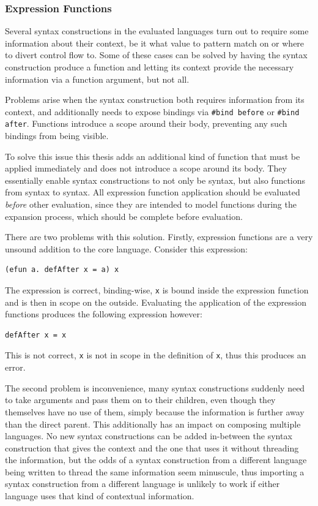 \documentclass{kththesis}
\begin{document}
\subsubsection{Expression Functions} \label{sec:efun-drawbacks}

Several syntax constructions in the evaluated languages turn out to require some information about their context, be it what value to pattern match on or where to divert control flow to. Some of these cases can be solved by having the syntax construction produce a function and letting its context provide the necessary information via a function argument, but not all.

Problems arise when the syntax construction both requires information from its context, and additionally needs to expose bindings via \texttt{#bind before} or \texttt{#bind after}. Functions introduce a scope around their body, preventing any such bindings from being visible.

To solve this issue this thesis adds an additional kind of function that must be applied immediately and does not introduce a scope around its body. They essentially enable syntax constructions to not only be syntax, but also functions from syntax to syntax. All expression function application should be evaluated \emph{before} other evaluation, since they are intended to model functions during the expansion process, which should be complete before evaluation.

There are two problems with this solution. Firstly, expression functions are a very unsound addition to the core language. Consider this expression:

\begin{verbatim}
(efun a. defAfter x = a) x
\end{verbatim}

The expression is correct, binding-wise, \texttt{x} is bound inside the expression function and is then in scope on the outside. Evaluating the application of the expression functions produces the following expression however:

\begin{verbatim}
defAfter x = x
\end{verbatim}

This is not correct, \texttt{x} is not in scope in the definition of \texttt{x}, thus this produces an error.

The second problem is inconvenience, many syntax constructions suddenly need to take arguments and pass them on to their children, even though they themselves have no use of them, simply because the information is further away than the direct parent. This additionally has an impact on composing multiple languages. No new syntax constructions can be added in-between the syntax construction that gives the context and the one that uses it without threading the information, but the odds of a syntax construction from a different language being written to thread the same information seem minuscule, thus importing a syntax construction from a different language is unlikely to work if either language uses that kind of contextual information.
\end{document}
